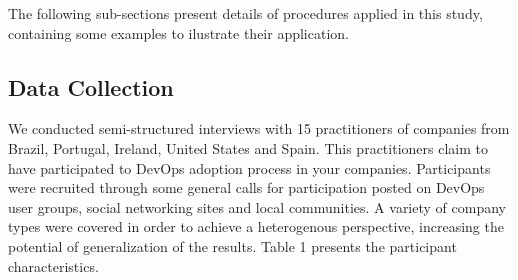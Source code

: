 The following sub-sections present details of procedures applied in this study,
containing some examples to ilustrate their application.

\subsection{Data Collection}
We conducted semi-structured interviews with 15 practitioners of companies from
Brazil, Portugal, Ireland, United States and Spain. This practitioners claim
to have participated to DevOps adoption process in your companies. Participants
were recruited through some general calls for participation posted on DevOps
user groups, social networking sites and local communities. A variety of
company types were covered in order to achieve a heterogenous perspective,
increasing the potential of generalization of the results. Table 1 presents the
participant characteristics.


